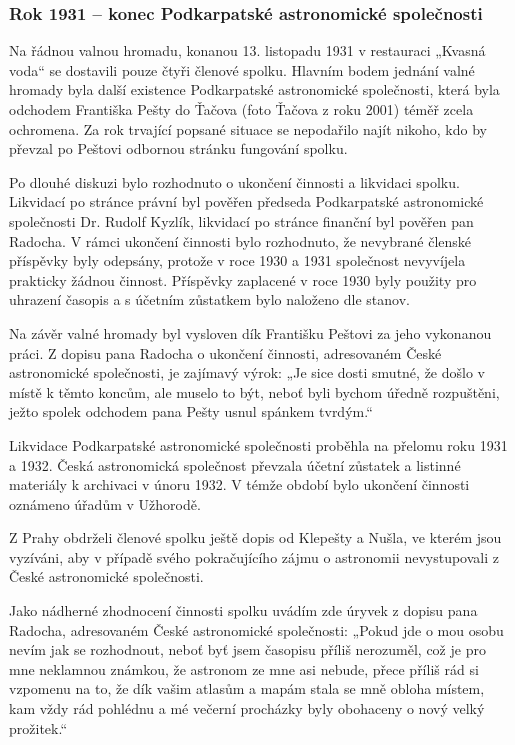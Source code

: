\documentclass[10pt,a5paper,twoside]{book}
\begin{document}
\subsubsection*{Rok 1931 – konec Podkarpatské astronomické společnosti}
\par Na řádnou valnou hromadu, konanou 13. listopadu 1931 v restauraci „Kvasná voda“ se dostavili pouze čtyři členové spolku. Hlavním bodem jednání valné hromady byla další existence Podkarpatské astronomické společnosti, která byla odchodem Františka Pešty do Ťačova (foto Ťačova z roku 2001) téměř zcela ochromena. Za rok trvající popsané situace se nepodařilo najít nikoho, kdo by převzal po Peštovi odbornou stránku fungování spolku. 
\par Po dlouhé diskuzi bylo rozhodnuto o ukončení činnosti a likvidaci spolku. Likvidací po stránce právní byl pověřen předseda Podkarpatské astronomické společnosti Dr. Rudolf Kyzlík, likvidací po stránce finanční byl pověřen pan Radocha. V rámci ukončení činnosti bylo rozhodnuto, že nevybrané členské příspěvky byly odepsány, protože v roce 1930 a 1931 společnost nevyvíjela prakticky žádnou činnost. Příspěvky zaplacené v roce 1930 byly použity pro uhrazení časopis a s účetním zůstatkem bylo naloženo dle stanov. 
\par Na závěr valné hromady byl vysloven dík Františku Peštovi za jeho vykonanou práci. Z dopisu pana Radocha o ukončení činnosti, adresovaném České astronomické společnosti, je zajímavý výrok: „Je sice dosti smutné, že došlo v místě k těmto koncům, ale muselo to být, neboť byli bychom úředně rozpuštěni, ježto spolek odchodem pana Pešty usnul spánkem tvrdým.“
\par Likvidace Podkarpatské astronomické společnosti proběhla na přelomu roku 1931 a 1932. Česká astronomická společnost převzala účetní zůstatek a listinné materiály k archivaci v únoru 1932. V témže období bylo ukončení činnosti oznámeno úřadům v Užhorodě.
\par Z Prahy obdrželi členové spolku ještě dopis od Klepešty a Nušla, ve kterém jsou vyzíváni, aby v případě svého pokračujícího zájmu o astronomii nevystupovali z České astronomické společnosti.
\par Jako nádherné zhodnocení činnosti spolku uvádím zde úryvek z dopisu pana Radocha, adresovaném České astronomické společnosti: „Pokud jde o mou osobu nevím jak se rozhodnout, neboť byť jsem časopisu příliš nerozuměl, což je pro mne neklamnou známkou, že astronom ze mne asi nebude, přece příliš rád si vzpomenu na to, že dík vašim atlasům a mapám stala se mně obloha místem, kam vždy rád pohlédnu a mé večerní procházky byly obohaceny o nový velký prožitek.“
\newpage
\end{document}
